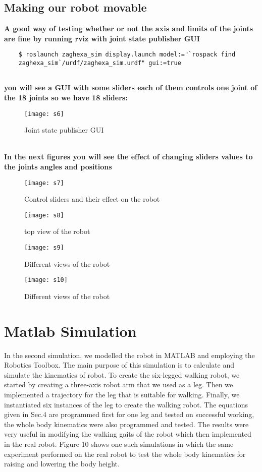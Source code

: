 	\subsection{Making our robot movable}
	\textbf{A good way of testing whether or not the axis and limits of the joints are fine by running rviz with joint state publisher GUI}
	\begin{lstlisting}
	$ roslaunch zaghexa_sim display.launch model:="`rospack find
	zaghexa_sim`/urdf/zaghexa_sim.urdf" gui:=true
	
	\end{lstlisting}
	\textbf{you will see a GUI with some sliders each of them controls one joint of the 18 joints so we have 18 sliders:}
	\begin{figure}[h]
		\centering
		\texttt{[image: s6]}
		\caption{Joint state publisher GUI}
		\label{fig:s6}
	\end{figure}
	\\\textbf{In the next figures you will see the effect of changing sliders values to the joints angles and positions}
	\begin{figure}[h]
		\centering
		\texttt{[image: s7]}
		\caption{Control sliders and their effect on the robot }
		\label{fig:s7}
	\end{figure}
	\begin{figure}[htb]
		\centering
		\texttt{[image: s8]}
		\caption{top view of the robot}
		\label{fig:s8}
		\texttt{[image: s9]}
		\caption{Different views of the robot}
		\label{fig:s9}
		\texttt{[image: s10]}
		\caption{Different views of the robot}
		\label{fig:s10}
	\end{figure}
\clearpage
\vspace{10cm}
\section{ Matlab Simulation}
In the second simulation, we modelled the robot in MATLAB and employing the Robotics Toolbox. The main purpose of this simulation is to calculate and simulate the kinematics of robot. To create the six-legged walking robot, we started by creating a three-axis robot arm that we used as a leg. Then we implemented a trajectory for the leg that is suitable for walking. Finally, we instantiated six instances of the leg to create the walking robot. The equations given in Sec.4 are programmed first for one leg and tested on successful working, the whole body kinematics were also programmed and tested.
The results were very useful in modifying the walking gaits of the robot which then implemented in the real robot. Figure 10 shows one such simulations in which the same experiment performed on the real robot to test the whole body kinematics for raising and lowering the body height.

